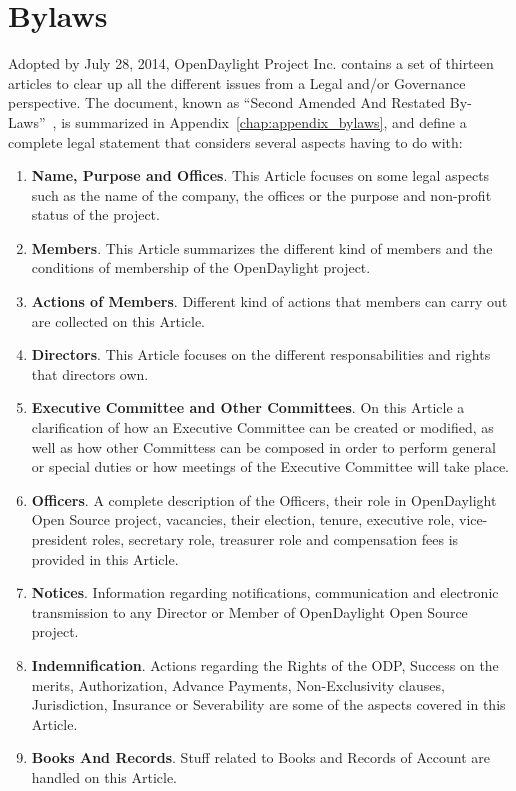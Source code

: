 \documentclass[a4paper, 12pt]{book}
\begin{document}
\section{Bylaws}
\label{sec:bylaws}
Adopted by July 28, 2014, OpenDaylight Project Inc. contains a set of thirteen articles to clear up all the different issues from a Legal and/or Governance perspective. The document, known as ``Second Amended And Restated By-Laws''~\cite{OpenDaylightBylaws}, is summarized in Appendix~\ref{chap:appendix_bylaws}, and define a complete legal statement that considers several aspects having to do with:
\begin{enumerate}\itemsep0pt
 \item{\textbf{Name, Purpose and Offices}}. This Article focuses on some legal aspects such as the name of the company, the offices or the purpose and non-profit status of the project.
 \item{\textbf{Members}}.  This Article summarizes the different kind of members and the conditions of membership of the OpenDaylight project.
 \item{\textbf{Actions of Members}}. Different kind of actions that members can carry out are collected on this Article.
 \item{\textbf{Directors}}. This Article focuses on the different responsabilities and rights that directors own.
 \item{\textbf{Executive Committee and Other Committees}}. On this Article a clarification of how an Executive Committee can be created or modified, as well as how other Committess can be composed in order to perform general or special duties or how meetings of the Executive Committee will take place.
 \item{\textbf{Officers}}. A complete description of the Officers, their role in OpenDaylight Open Source project, vacancies, their election, tenure, executive role, vice-president roles, secretary role, treasurer role and compensation fees is provided in this Article.
 \item{\textbf{Notices}}. Information regarding notifications, communication and electronic transmission to any Director or Member of OpenDaylight Open Source project.
 \item{\textbf{Indemnification}}. Actions regarding the Rights of the ODP, Success on the merits, Authorization, Advance Payments, Non-Exclusivity clauses, Jurisdiction, Insurance or Severability are some of the aspects covered in this Article.
 \item{\textbf{Books And Records}}. Stuff related to Books and Records of Account are handled on this Article.

\end{enumerate}
\end{document}
